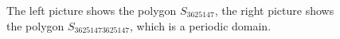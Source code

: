 \documentclass[a4paper, 12pt]{article}
\begin{document}
\begin{figure}[h]
\begin{minipage}[h]{0.49\linewidth}
\end{minipage}
\begin{minipage}[h]{0.49\linewidth}
\end{minipage}
\caption{The left picture shows the polygon $S_{3625147}$, the right picture shows the polygon $S_{36251473625147}$, which is a periodic domain.}


\label{ris:image1}
\end{figure}
\end{document}
